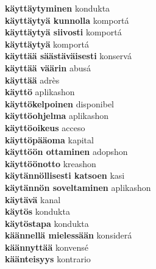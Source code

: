 \textbf{ käyttäytyminen  } kondukta \\
\textbf{ käyttäytyä kunnolla  } komportá \\
\textbf{ käyttäytyä siivosti  } komportá \\
\textbf{ käyttäytyä  } komportá \\
\textbf{ käyttää säästäväisesti  } konservá \\
\textbf{ käyttää väärin  } abusá \\
\textbf{ käyttää  } adrès \\
\textbf{ käyttö  } aplikashon \\
\textbf{ käyttökelpoinen  } disponibel \\
\textbf{ käyttöohjelma  } aplikashon \\
\textbf{ käyttöoikeus  } acceso \\
\textbf{ käyttöpääoma  } kapital \\
\textbf{ käyttöön ottaminen  } adopshon \\
\textbf{ käyttöönotto  } kreashon \\
\textbf{ käytännöllisesti katsoen  } kasi \\
\textbf{ käytännön soveltaminen  } aplikashon \\
\textbf{ käytävä  } kanal \\
\textbf{ käytös  } kondukta \\
\textbf{ käytöstapa  } kondukta \\
\textbf{ käännellä mielessään  } konsiderá \\
\textbf{ käännyttää  } konvensé \\
\textbf{ käänteisyys  } kontrario \\
